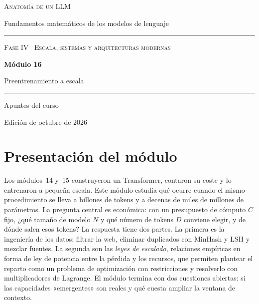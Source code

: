 \documentclass[11pt,a4paper,twoside,openany]{book}
\begin{document}
\frontmatter
\begin{titlepage}
\centering
\vspace*{2.5cm}
{\large\scshape Anatomía de un LLM}\par
\vspace{0.4cm}
{\normalsize Fundamentos matemáticos de los modelos de lenguaje}\par
\vspace{2.2cm}
\rule{\textwidth}{0.8pt}\par\vspace{0.5cm}
{\small\scshape Fase IV \textperiodcentered\ Escala, sistemas y arquitecturas modernas}\par\vspace{0.3cm}
{\Huge\bfseries Módulo 16\par}\vspace{0.3cm}
{\LARGE Preentrenamiento a escala\par}
\vspace{0.5cm}\rule{\textwidth}{0.4pt}\par
\vspace{1.6cm}
{\large Apuntes del curso}\par
\vfill
{\small Edición de octubre de 2026}\par
\end{titlepage}

\chapter*{Presentación del módulo}

Los módulos~14 y~15 construyeron un Transformer, contaron su coste y lo entrenaron a pequeña escala. Este módulo estudia qué ocurre cuando el mismo procedimiento se lleva a billones de tokens y a decenas de miles de millones de parámetros. La pregunta central es económica: con un presupuesto de cómputo $C$ fijo, ¿qué tamaño de modelo $N$ y qué número de tokens $D$ conviene elegir, y de dónde salen esos tokens? La respuesta tiene dos partes. La primera es la ingeniería de los datos: filtrar la web, eliminar duplicados con MinHash y LSH y mezclar fuentes. La segunda son las \emph{leyes de escalado}, relaciones empíricas en forma de ley de potencia entre la pérdida y los recursos, que permiten plantear el reparto como un problema de optimización con restricciones y resolverlo con multiplicadores de Lagrange. El módulo termina con dos cuestiones abiertas: si las capacidades «emergentes» son reales y qué cuesta ampliar la ventana de contexto.
\end{document}
